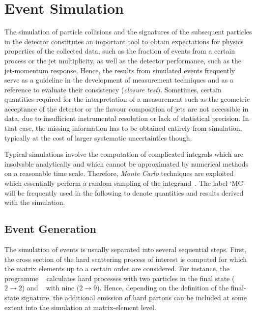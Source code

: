 \section{Event Simulation} \label{sec:Jets:EvtSim}
The simulation of particle collisions and the signatures of the subsequent particles in the detector constitutes an important tool to obtain expectations for physics properties of the collected data, such as the fraction of events from a certain process or the jet multiplicity, as well as the detector performance, such as the jet-momentum response.
Hence, the results from simulated events frequently serve as a guideline in the development of measurement techniques and as a reference to evaluate their consistency (\textit{closure test}).
Sometimes, certain quantities required for the interpretation of a measurement such as the geometric acceptance of the detector or the flavour composition of jets are not accessible in data, \eg due to insufficient instrumental resolution or lack of statistical precision.
In that case, the missing information has to be obtained entirely from simulation, typically at the cost of larger systematic uncertainties though.

Typical simulations involve the computation of complicated integrals which are insolvable analytically and which cannot be approximated by numerical methods on a reasonable time scale.
Therefore, \textit{Monte Carlo} techniques are exploited which essentially perform a random sampling of the integrand~\cite{bib:MCMethod,bib:BargerPhillips}.
The label `MC' will be frequently used in the following to denote quantities and results derived with the simulation.

\subsection{Event Generation}
The simulation of events is usually separated into several sequential steps.
First, the cross section of the hard scattering process of interest is computed for which the matrix elements up to a certain order are considered.
For instance, the programme \pythia~\cite{bib:sjostrand:pythia} calculates hard processes with two particles in the final state ($2\rightarrow2$) and \madgraph~\cite{bib:alwall:madgraph} with nine ($2\rightarrow9$).
Hence, depending on the definition of the final-state signature, the additional emission of hard partons can be included at some extent into the simulation at matrix-element level.

